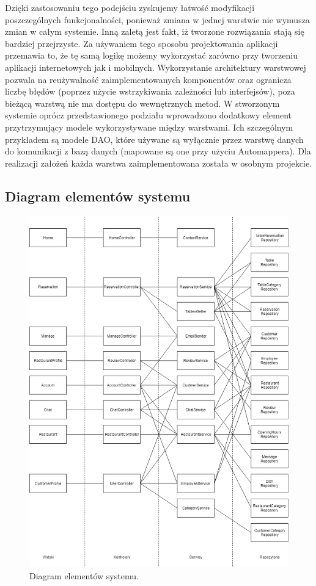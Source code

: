 \documentclass{article}
\begin{document}
Dzięki zastosowaniu tego podejściu zyskujemy łatwość modyfikacji poszczególnych funkcjonalności, ponieważ zmiana w jednej warstwie nie wymusza zmian w całym systemie. Inną zaletą jest fakt, iż tworzone rozwiązania stają się bardziej przejrzyste. Za używaniem tego sposobu projektowania aplikacji przemawia to, że tę samą logikę możemy wykorzystać zarówno przy tworzeniu aplikacji internetowych jak i mobilnych. Wykorzystanie architektury warstwowej pozwala na reużywalność zaimplementowanych komponentów oraz ogranicza liczbę błędów (poprzez użycie wstrzykiwania zależności lub interfejsów), poza bieżącą warstwą nie ma dostępu do wewnętrznych metod. W stworzonym systemie oprócz przedstawionego podziału wprowadzono dodatkowy element przytrzymujący modele wykorzystywane między warstwami. Ich szczególnym przykładem są modele DAO, które używane są wyłącznie przez warstwę danych do komunikacji z bazą danych (mapowane są one przy użyciu Automappera). Dla realizacji założeń każda warstwa zaimplementowana została w osobnym projekcie.

\subsection{Diagram elementów systemu}

\begin{figure}[H]
\centering
	\includegraphics[width=1.00\textwidth]{System.png}
	\caption{Diagram elementów systemu.}
	\label{fig:system}
\end{figure}
\end{document}
